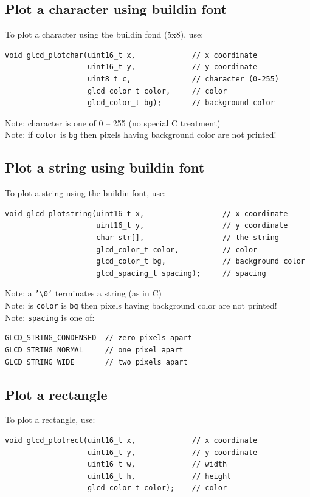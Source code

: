\documentclass[12pt]{article}
\begin{document}
\subsection{Plot a character using buildin font}
To plot a character using the buildin fond (5x8), use:
\begin{lstlisting}
void glcd_plotchar(uint16_t x,             // x coordinate
                   uint16_t y,             // y coordinate
                   uint8_t c,              // character (0-255)
                   glcd_color_t color,     // color
                   glcd_color_t bg);       // background color
\end{lstlisting}

Note: character is one of 0 -- 255 (no special C treatment)\\
Note: if \texttt{color} is \texttt{bg} then pixels having background color are not printed! 

\subsection{Plot a string using buildin font}
To plot a string using the buildin font, use:
\begin{lstlisting}
void glcd_plotstring(uint16_t x,                  // x coordinate
                     uint16_t y,                  // y coordinate
                     char str[],                  // the string
                     glcd_color_t color,          // color
                     glcd_color_t bg,             // background color
                     glcd_spacing_t spacing);     // spacing
\end{lstlisting}

Note: a \texttt{'\textbackslash 0'} terminates a string (as in C)\\
Note: is \texttt{color} is \texttt{bg} then pixels having background color are not printed!\\
Note: \texttt{spacing} is one of:
\begin{lstlisting}
GLCD_STRING_CONDENSED  // zero pixels apart
GLCD_STRING_NORMAL     // one pixel apart
GLCD_STRING_WIDE       // two pixels apart
\end{lstlisting}

\subsection{Plot a rectangle}
To plot a rectangle, use:
\begin{lstlisting}
void glcd_plotrect(uint16_t x,             // x coordinate
                   uint16_t y,             // y coordinate
                   uint16_t w,             // width
                   uint16_t h,             // height
                   glcd_color_t color);    // color
\end{lstlisting}
\end{document}
